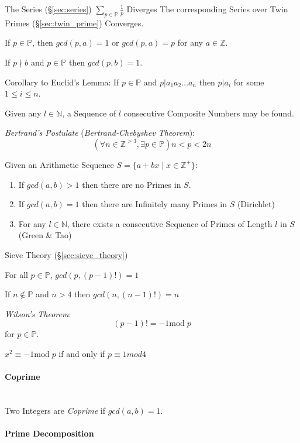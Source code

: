 The Series (\S\ref{sec:series}) $\sum_{p \in \mathbb{P}} \frac{1}{p}$
Diverges The corresponding Series over Twin Primes
(\S\ref{sec:twin_prime}) Converges.

If $p \in \mathbb{P}$, then $gcd(p,a) = 1$ or $gcd(p,a) = p$ for any
$a \in \mathbb{Z}$.

If $p \nmid b$ and $p \in \mathbb{P}$ then $gcd (p,b) = 1$.

Corollary to Euclid's Lemma: If $p \in \mathbb{P}$ and $p|a_1 a_2
\ldots a_n$ then $p|a_i$ for some $1 \leq i \leq n$.

Given any $l \in \mathbb{N}$, a Sequence of $l$ consecutive Composite
Numbers may be found.

\emph{Bertrand's Postulate} (\emph{Bertrand-Chebyshev Theorem}):
\[
  (\forall n \in \mathbb{Z}^{>3}, \exists p \in \mathbb{P}) n < p < 2n
\]

Given an Arithmetic Sequence $S = \{ a + bx \;|\; x \in \mathbb{Z}^+\}$:
\begin{enumerate}
  \item If $gcd(a,b) > 1$ then there are no Primes in $S$.
  \item If $gcd(a,b) = 1$ then there are Infinitely many Primes in $S$
    (Dirichlet)
  \item For any $l \in \mathbb{N}$, there exists a consecutive
    Sequence of Primes of Length $l$ in $S$ (Green \& Tao)
\end{enumerate}

Sieve Theory (\S\ref{sec:sieve_theory})

For all $p \in \mathbb{P}$, $gcd(p, (p-1)!) = 1$

If $n \notin \mathbb{P}$ and $n > 4$ then $gcd(n,(n-1)!) = n$

\emph{Wilson's Theorem}:
\[
  (p - 1)! = -1 \mathrm{mod}\;p
\]
for $p \in \mathbb{P}$.

$x^2 \equiv -1 \mathrm{mod}\;p$ if and only if $p \equiv 1 mod 4$



\paragraph{Coprime}\label{sec:coprime}
\hfill \\

Two Integers are \emph{Coprime} if $gcd (a,b) = 1$.



\paragraph{Prime Decomposition}\label{sec:prime_decomposition}
\hfill \\

